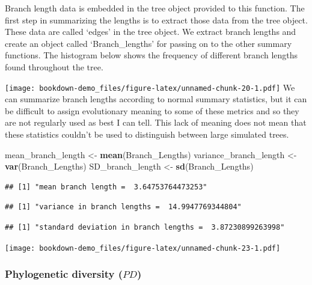 \documentclass[]{book}
\newenvironment{Shaded}{\begin{snugshade}}{\end{snugshade}}
\newcommand{\KeywordTok}[1]{\textcolor[rgb]{0.13,0.29,0.53}{\textbf{{#1}}}}
\newcommand{\StringTok}[1]{\textcolor[rgb]{0.31,0.60,0.02}{{#1}}}
\newcommand{\OperatorTok}[1]{\textcolor[rgb]{0.81,0.36,0.00}{\textbf{{#1}}}}
\newcommand{\NormalTok}[1]{{#1}}
\theoremstyle{definition}
\theoremstyle{definition}
\theoremstyle{remark}
\begin{document}
Branch length data is embedded in the tree object provided to this
function. The first step in summarizing the lengths is to extract those
data from the tree object. These data are called `edges' in the tree
object. We extract branch lengths and create an object called
`Branch\_lengths' for passing on to the other summary functions. The
histogram below shows the frequency of different branch lengths found
throughout the tree.

\begin{Shaded}
\end{Shaded}

\texttt{[image: bookdown-demo\_files/figure-latex/unnamed-chunk-20-1.pdf]}
We can summarize branch lengths according to normal summary statistics,
but it can be difficult to assign evolutionary meaning to some of these
metrics and so they are not regularly used as best I can tell. This lack
of meaning does not mean that these statistics couldn't be used to
distinguish between large simulated trees.

\begin{Shaded}
\begin{Highlighting}[]
\NormalTok{mean_branch_length <-}\StringTok{ }\KeywordTok{mean}\NormalTok{(Branch_Lengths)}
\NormalTok{variance_branch_length <-}\StringTok{ }\KeywordTok{var}\NormalTok{(Branch_Lengths)}
\NormalTok{SD_branch_length <-}\StringTok{ }\KeywordTok{sd}\NormalTok{(Branch_Lengths)}
\end{Highlighting}
\end{Shaded}

\begin{verbatim}
## [1] "mean branch length =  3.64753764473253"
\end{verbatim}

\begin{verbatim}
## [1] "variance in branch lengths =  14.9947769344804"
\end{verbatim}

\begin{verbatim}
## [1] "standard deviation in branch lengths =  3.87230899263998"
\end{verbatim}

\texttt{[image: bookdown-demo\_files/figure-latex/unnamed-chunk-23-1.pdf]}

\subsubsection{\texorpdfstring{Phylogenetic diversity
(\(PD\))}{Phylogenetic diversity (PD)}}\label{phylogenetic-diversity-pd}
\end{document}
